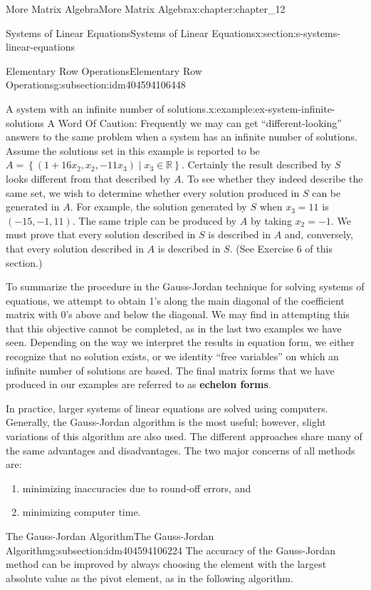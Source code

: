 \documentclass[twoside,10pt,]{book}
\newcommand{\terminology}[1]{\textbf{#1}}
\numberwithin{equation}{section}
\begin{document}
\begin{chapterptx}{More Matrix Algebra}{}{More Matrix Algebra}{}{}{x:chapter:chapter_12}
\begin{sectionptx}{Systems of Linear Equations}{}{Systems of Linear Equations}{}{}{x:section:s-systems-linear-equations}
\begin{subsectionptx}{Elementary Row Operations}{}{Elementary Row Operations}{}{}{g:subsection:idm404594106448}
\begin{example}{A system with an infinite number of solutions.}{x:example:ex-system-infinite-solutions}
A Word Of Caution: Frequently we may can get ``different-looking'' answers to the same problem when a system has an infinite number of solutions. Assume the solutions set in this example is reported to be \(A = \left\{\left(1+16x_2, x_2, -11x_3\right) \mid x_3\in \mathbb{R}\right\}\). Certainly the result described by \(S\) looks different from that described by \(A\). To see whether they indeed describe the same set, we wish to determine whether every solution produced in \(S\) can be generated in \(A\). For example, the solution generated by \(S\) when \(x_3=11\) is \((-15, -1, 11)\). The same triple can be produced by \(A\) by taking \(x_2= -1\). We must prove that every solution described in \(S\) is described in \(A\) and, conversely, that every solution described in \(A\) is described in \(S\). (See Exercise 6 of this section.)%
\end{example}
To summarize the procedure in the Gauss-Jordan technique for solving systems of equations, we attempt to obtain 1's along the main diagonal of the coefficient matrix with 0's above and below the diagonal. We may find in attempting this that this objective cannot be completed, as in the last two examples we have seen.  Depending on the way we interpret the results in equation form, we either recognize that no solution exists, or we identity ``free variables'' on which an infinite number of solutions are based.  The final matrix forms that we have produced in our examples are referred to as  \terminology{echelon forms}.%
\par
In practice, larger systems of linear equations are solved using computers. Generally, the Gauss-Jordan algorithm is the most useful; however, slight variations of this algorithm are also used. The different approaches share many of the same advantages and disadvantages. The two major concerns of all methods are:%
\begin{enumerate}[label=(\arabic*)]
\item{}minimizing inaccuracies due to round-off errors, and%
\item{}minimizing computer time.%
\end{enumerate}
%
\end{subsectionptx}
%
%
\typeout{************************************************}
\typeout{************************************************}
%
\begin{subsectionptx}{The Gauss-Jordan Algorithm}{}{The Gauss-Jordan Algorithm}{}{}{g:subsection:idm404594106224}
The accuracy of the Gauss-Jordan method can be improved by always choosing the element with the largest absolute value as the pivot element, as in the following algorithm.%

\end{subsectionptx}
\end{sectionptx}
\end{chapterptx}
\end{document}
